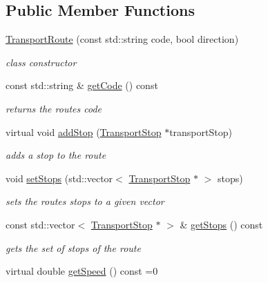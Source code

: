 \subsection*{Public Member Functions}
\begin{DoxyCompactItemize}
\item 
\hyperlink{class_transport_route_a5eaa150e32517b46d0b642bdfdf28647}{Transport\+Route} (const std\+::string code, bool direction)
\begin{DoxyCompactList}\small\item\em class constructor \end{DoxyCompactList}\item 
\hypertarget{class_transport_route_a7b33d609c63e776244eca94632371a9f}{}const std\+::string \& \hyperlink{class_transport_route_a7b33d609c63e776244eca94632371a9f}{get\+Code} () const \label{class_transport_route_a7b33d609c63e776244eca94632371a9f}

\begin{DoxyCompactList}\small\item\em returns the route\textquotesingle{}s code \end{DoxyCompactList}\item 
virtual void \hyperlink{class_transport_route_a79f31c2682d702c1c0a44baed7dbf520}{add\+Stop} (\hyperlink{class_transport_stop}{Transport\+Stop} $\ast$transport\+Stop)
\begin{DoxyCompactList}\small\item\em adds a stop to the route \end{DoxyCompactList}\item 
void \hyperlink{class_transport_route_a3a358665ed7bf5d69d7135f4032c5da0}{set\+Stops} (std\+::vector$<$ \hyperlink{class_transport_stop}{Transport\+Stop} $\ast$ $>$ stops)
\begin{DoxyCompactList}\small\item\em sets the route\textquotesingle{}s stops to a given vector \end{DoxyCompactList}\item 
const std\+::vector$<$ \hyperlink{class_transport_stop}{Transport\+Stop} $\ast$ $>$ \& \hyperlink{class_transport_route_ada9ff1cd5c1a2c9ae57f6371a18f864f}{get\+Stops} () const 
\begin{DoxyCompactList}\small\item\em gets the set of stops of the route \end{DoxyCompactList}\item 
\hypertarget{class_transport_route_a76a8834e9595e973f61f3376ff3d9d34}{}virtual double \hyperlink{class_transport_route_a76a8834e9595e973f61f3376ff3d9d34}{get\+Speed} () const =0\label{class_transport_route_a76a8834e9595e973f61f3376ff3d9d34}


\end{DoxyCompactItemize}
